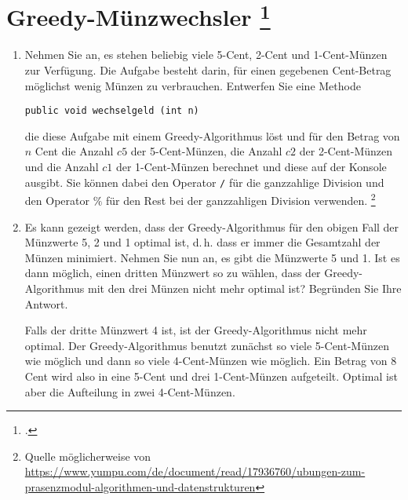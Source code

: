 \documentclass{lehramt-informatik-aufgabe}
\begin{document}

\section{Greedy-Münzwechsler
\footcite[Seite 1, Aufgabe 1: Greedy-Münzwechsler]{aud:ab:3}}

\begin{enumerate}


\item Nehmen Sie an, es stehen beliebig viele 5-Cent, 2-Cent und
1-Cent-Münzen zur Verfügung. Die Aufgabe besteht darin, für einen
gegebenen Cent-Betrag möglichst wenig Münzen zu verbrauchen. Entwerfen
Sie eine Methode

\begin{verbatim}
public void wechselgeld (int n)
\end{verbatim}

die diese Aufgabe mit einem Greedy-Algorithmus löst und für den Betrag
von $n$ Cent die Anzahl $c5$ der 5-Cent-Münzen, die Anzahl $c2$ der
2-Cent-Münzen und die Anzahl $c1$ der 1-Cent-Münzen berechnet und diese
auf der Konsole ausgibt. Sie können dabei den Operator \texttt{/} für
die ganzzahlige Division und den Operator $\%$ für den Rest bei der
ganzzahligen Division verwenden.
\footnote{Quelle möglicherweise von \url{https://www.yumpu.com/de/document/read/17936760/ubungen-zum-prasenzmodul-algorithmen-und-datenstrukturen}}

\begin{liAntwort}
\end{liAntwort}


\item Es kann gezeigt werden, dass der Greedy-Algorithmus für den obigen
Fall der Münzwerte 5, 2 und 1 optimal ist, d.\,h. dass er immer die
Gesamtzahl der Münzen minimiert. Nehmen Sie nun an, es gibt die
Münzwerte 5 und 1. Ist es dann möglich, einen dritten Münzwert so zu
wählen, dass der Greedy-Algorithmus mit den drei Münzen nicht mehr
optimal ist? Begründen Sie Ihre Antwort.

\begin{liAntwort}
Falls der dritte Münzwert 4 ist, ist der Greedy-Algorithmus nicht mehr
optimal. Der Greedy-Algorithmus benutzt zunächst so viele 5-Cent-Münzen
wie möglich und dann so viele 4-Cent-Münzen wie möglich. Ein Betrag von
8 Cent wird also in eine 5-Cent und drei 1-Cent-Münzen aufgeteilt.
Optimal ist aber die Aufteilung in zwei 4-Cent-Münzen.
\end{liAntwort}
\end{enumerate}
\end{document}
